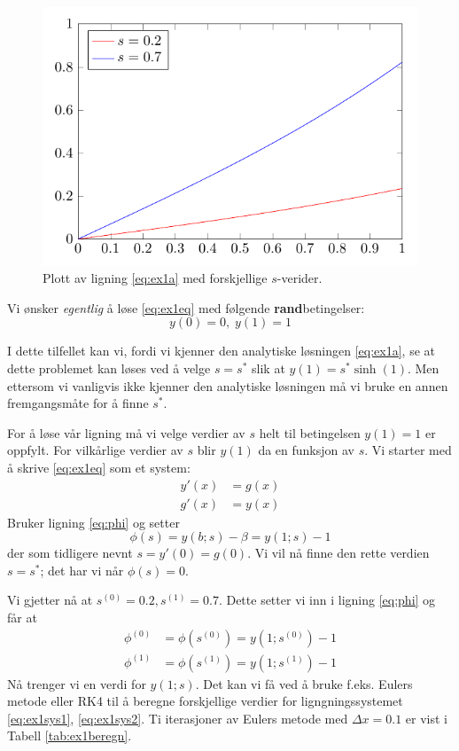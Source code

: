\begin{figure}[htb]
  \centering
  \includegraphics[]{illustrasjoner/plot_s.pdf}
  \caption{Plott av ligning \eqref{eq:ex1a} med forskjellige $s$-verider.}
  \label{fig:s_verdier}
\end{figure}

\noindent Vi ønsker \emph{egentlig} å løse \eqref{eq:ex1eq} med følgende \textbf{rand}betingelser:
\begin{equation}
  y(0) = 0, \; y(1) = 1 \tag{rb}
\end{equation}

I dette tilfellet kan vi, fordi vi kjenner den analytiske løsningen \eqref{eq:ex1a}, se at dette problemet kan løses ved å velge $s=s^*$ slik at $y(1)=s^* \sinh(1)$. Men ettersom vi vanligvis ikke kjenner den analytiske løsningen må vi bruke en annen fremgangsmåte for å finne $s^*$.

For å løse vår ligning må vi velge verdier av $s$ helt til betingelsen $y(1)=1$ er oppfylt. For vilkårlige verdier av $s$ blir $y(1)$ da en funksjon av $s$. Vi starter med å skrive \eqref{eq:ex1eq} som et system:
\begin{align}
  y'(x) &= g(x) \label{eq:ex1sys1} \\
  g'(x) &= y(x) \label{eq:ex1sys2}
\end{align}
Bruker ligning \eqref{eq:phi} og setter
\begin{equation}
  \phi (s) = y(b;s) - \beta = y(1;s) - 1
\end{equation}
der som tidligere nevnt $s=y'(0)=g(0)$. Vi vil nå finne den rette verdien $s=s^*$; det har vi når $\phi(s)=0$.

Vi gjetter nå at $s^{(0)}=0.2, s^{(1)}=0.7$. Dette setter vi inn i ligning \eqref{eq:phi} og får at
\begin{align}
  \phi^{(0)} &= \phi(s^{(0)}) = y(1;s^{(0)}) - 1 \label{eq:exphi1} \\
  \phi^{(1)} &= \phi(s^{(1)}) = y(1;s^{(1)}) - 1 \label{eq:exphi2}
\end{align}
Nå trenger vi en verdi for $y(1;s)$. Det kan vi få ved å bruke f.eks. Eulers metode eller RK4 til å beregne forskjellige verdier for ligngningssystemet \eqref{eq:ex1sys1}, \eqref{eq:ex1sys2}. Ti iterasjoner av Eulers metode med $\Delta x=0.1$ er vist i Tabell \ref{tab:ex1beregn}.

